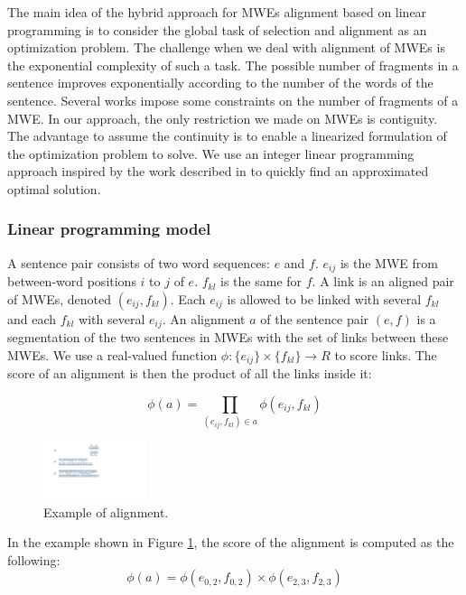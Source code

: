 \documentclass[output=paper,modfonts,nonflat]{langsci/langscibook}
\begin{document}
The main idea of the hybrid approach for MWEs alignment based on linear programming is to consider the global task of selection and alignment as an optimization problem. 
The challenge when we deal with alignment of MWEs is the exponential complexity of such a task. 
The possible number of fragments in a sentence improves exponentially according to the number of the words of the sentence. 
Several works impose some constraints on the number of fragments of a MWE. 
In our approach, the only restriction we made on MWEs is contiguity. The advantage to assume the continuity is to enable a linearized formulation of the optimization problem to solve. We use an integer linear programming approach inspired by the work described in \citep{denero2008complexity} to quickly find an approximated optimal solution.

\subsubsection{Linear programming model}

A sentence pair consists of two word sequences: $e$ and $f$. 
$e_{ij}$ is the MWE from between-word positions $i$ to $j$ of $e$. 
$f_{kl}$ is the same for $f$. 
A link is an aligned pair of MWEs, denoted $(e_{ij},f_{kl})$. 
Each $e_{ij}$ is allowed to be linked with several $f_{kl}$ and each $f_{kl}$ with several $e_{ij}$. 
An alignment $a$ of the sentence pair $(e,f)$ is a segmentation of the two sentences in MWEs with the set of links between these MWEs.
We use a real-valued function $\phi:\{e_{ij}\}\times\{f_{kl}\}\rightarrow R$ to score links. 
The score of an alignment is then the product of all the links inside it:

\begin{equation}
\phi(a)=\prod_{(e_{ij},f_{kl})\in a} \phi(e_{ij},f_{kl})
\end{equation}

\begin{figure}
\includegraphics[width=3cm]{figures/Figure_exempleAli}
\caption{\label{fig:aliEx}Example of alignment.}
\end{figure}


In the example shown in Figure \ref{fig:aliEx}, the score of the alignment is computed as the following:
\begin{equation}
\phi(a)=\phi(e_{0,2},f_{0,2}) \times \phi(e_{2,3},f_{2,3})
\end{equation}
\end{document}
